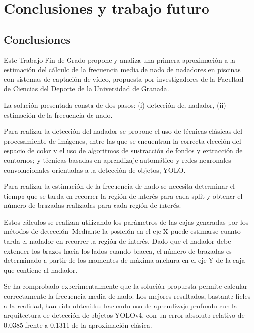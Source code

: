 \chapter{Conclusiones y trabajo futuro} \label{cap:capitulo6}

\section{Conclusiones}

Este Trabajo Fin de Grado propone y analiza una primera aproximación a la estimación del cálculo de la frecuencia media de nado de nadadores en piscinas con sistemas de captación de vídeo, propuesta por investigadores de la Facultad de Ciencias del Deporte de la Universidad de Granada. 

La solución presentada consta de dos pasos: (i) detección del nadador, (ii) estimación de la frecuencia de nado. 

Para realizar la detección del nadador se propone el uso de técnicas clásicas del procesamiento de imágenes, entre las que se encuentran la correcta elección del espacio de color y el uso de algoritmos de sustracción de fondos y extracción de contornos; y técnicas basadas en aprendizaje automático y redes neuronales convolucionales orientadas a la detección de objetos, YOLO. 

Para realizar la estimación de la frecuencia de nado se necesita determinar el tiempo que se tarda en recorrer la región de interés para cada split y obtener el número de brazadas realizadas para cada región de interés.

Estos cálculos se realizan utilizando los parámetros de las cajas generadas por los métodos de detección. Mediante la posición en el eje X puede estimarse cuanto tarda el nadador en recorrer la región de interés. Dado que el nadador debe extender los brazos hacia los lados cuando bracea, el número de brazadas es determinado a partir de los momentos de máxima anchura en el eje Y de la caja que contiene al nadador.

Se ha comprobado experimentalmente que la solución propuesta permite calcular correctamente la frecuencia media de nado. Los mejores resultados, bastante fieles a la realidad, han sido obtenidos haciendo uso de aprendizaje profundo con la arquitectura de detección de objetos YOLOv4, con un error absoluto relativo de 0.0385 frente a 0.1311 de la aproximación clásica.

